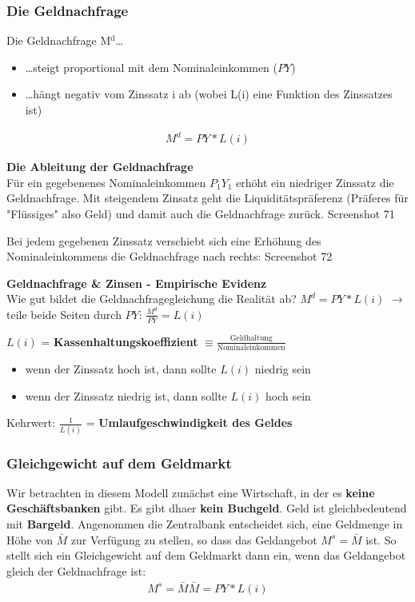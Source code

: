 \documentclass[11pt]{article}
\begin{document}
\subsubsection{Die Geldnachfrage}
\label{sec:org425ee29}
Die Geldnachfrage M\(^{\text{d}}\)\ldots{}
\begin{itemize}
\item \ldots{}steigt proportional mit dem Nominaleinkommen (\(PY\))
\item \ldots{}hängt negativ vom Zinssatz i ab (wobei L(i) eine Funktion des Zinssatzes ist)
\end{itemize}
\begin{equation*}
\begin{aligned}
M^d = PY*L(i)
\end{aligned}
\end{equation*}

\textbf{Die Ableitung der Geldnachfrage}\\
Für ein gegebenenes Nominaleinkommen \(P_1 Y_1\) erhöht ein niedriger Zinssatz die Geldnachfrage. 
Mit steigendem Zinsatz geht die Liquiditätspräferenz (Präferes für "Flüssiges" also Geld) und damit auch die Geldnachfrage zurück. Screenshot 71

Bei jedem gegebenen Zinssatz verschiebt sich eine Erhöhung des Nominaleinkommens die Geldnachfrage nach rechts: Screenshot 72

\textbf{Geldnachfrage \& Zinsen - Empirische Evidenz}\\
Wie gut bildet die Geldnachfragegleichung die Realität ab?
\(M^d = PY * L(i)\) \(\rightarrow\) teile beide Seiten durch \(PY\): \(\frac{M^d}{PY}=L(i)\)

\(L(i)\) = \textbf{Kassenhaltungskoeffizient} \(\equiv \frac{\text{Geldhaltung}}{\text{Nominaleinkommen}}\)
\begin{itemize}
\item wenn der Zinssatz hoch ist, dann sollte \(L(i)\) niedrig sein
\item wenn der Zinssatz niedrig ist, dann sollte \(L(i)\) hoch sein
\end{itemize}

Kehrwert: \(\frac{1}{L(i)}\) = \textbf{Umlaufgeschwindigkeit des Geldes}

\subsubsection{Gleichgewicht auf dem Geldmarkt}
\label{sec:orgb395d10}
Wir betrachten in diesem Modell zunächst eine Wirtschaft, in der es \textbf{keine Geschäftsbanken} gibt. Es gibt dhaer \textbf{kein Buchgeld}. Geld ist gleichbedeutend mit \textbf{Bargeld}. Angenommen die Zentralbank entscheidet sich, eine Geldmenge in Höhe von \(\bar{M}\) zur Verfügung zu stellen, so dass das Geldangebot \(M^s = \bar{M}\) ist.
So stellt sich ein Gleichgewicht auf dem Geldmarkt dann ein, wenn das Geldangebot gleich der Geldnachfrage ist:
\begin{equation*}
\begin{aligned}
M^s = \bar{M}
\bar{M} = PY * L(i)
\end{aligned}
\end{equation*}
\end{document}
